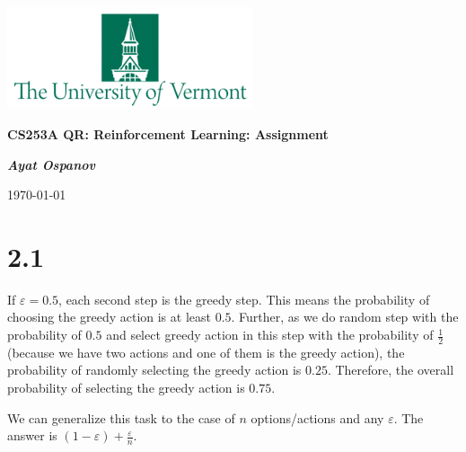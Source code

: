 \documentclass[12pt, a4paper]{article}
\begin{document}
    \begin{center}
        \includegraphics[height=3cm]{UVM.png}

        {\large\textbf{
            CS253A QR: Reinforcement Learning: Assignment 
        }}

        \vspace{0.3cm}

        \textit{\textbf{Ayat Ospanov}}

        \today
    \end{center}

    \tableofcontents
    \section{2.1}\label{sec:2.1}
        If $\varepsilon = 0.5$, each second step is the greedy step. This means the probability
        of choosing the greedy action is at least $0.5$. Further, as we do random step with the
        probability of $0.5$ and select greedy action in this step with the probability of $\frac{1}{2}$
        (because we have two actions and one of them is the greedy action), the probability of
        randomly selecting the greedy action is $0.25$. Therefore, the overall probability of
        selecting the greedy action is $0.75$.

        We can generalize this task to the case of $n$ options/actions and any $\varepsilon$. The answer
        is $(1 - \varepsilon) + \frac{\varepsilon}{n}$.
\end{document}
